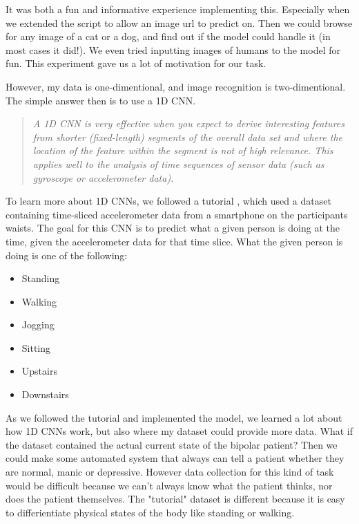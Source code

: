 It was both a fun and informative experience implementing this. Especially when we extended the script to allow an image url to predict on. 
Then we could browse for any image of a cat or a dog, and find out if the model could handle it (in most cases it did!). 
We even tried inputting images of humans to the model for fun. This experiment gave us a lot of motivation for our task.

\newpage

However, my data is one-dimentional, and image recognition is two-dimentional. The simple answer then is to use a 1D CNN.

\begin{quote}
  \textit{A 1D CNN is very effective when you expect to derive interesting features from shorter (fixed-length) segments of the overall data set 
  and where the location of the feature within the segment is not of high relevance. This applies well to the analysis of time sequences of sensor data 
  (such as gyroscope or accelerometer data).} \cite{1d_cnn}
\end{quote}

To learn more about 1D CNNs, we followed a tutorial \cite{1d_cnn}, which used a dataset containing 
time-sliced accelerometer data from a smartphone on the participants waists. The goal for this CNN is to predict what a given person is doing 
at the time, given the accelerometer data for that time slice. What the given person is doing is one of the following:
\begin{itemize}
  \item Standing
  \item Walking
  \item Jogging
  \item Sitting
  \item Upstairs
  \item Downstairs
\end{itemize}

As we followed the tutorial and implemented the model, we learned a lot about how 1D CNNs work, but also where my dataset could provide more data. 
What if the dataset contained the actual current state of the bipolar patient? Then we could make some automated system that always can tell a patient 
whether they are normal, manic or depressive. However data collection for this kind of task would be difficult because we can't always know what the
patient thinks, nor does the patient themselves. The "tutorial" dataset is different because it is easy to differientiate physical states of the body
like standing or walking.

